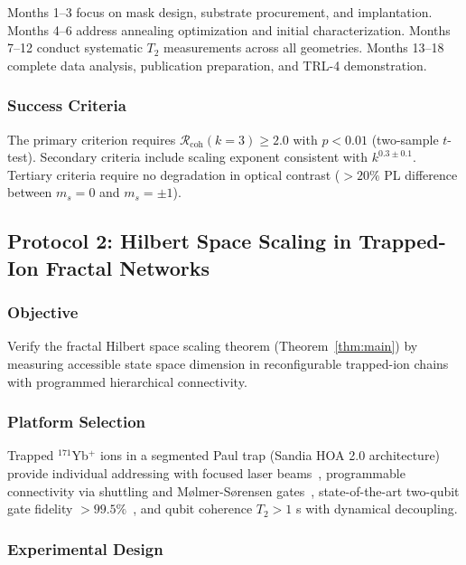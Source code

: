 Months 1--3 focus on mask design, substrate procurement, and implantation. Months 4--6 address annealing optimization and initial characterization. Months 7--12 conduct systematic $T_2$ measurements across all geometries. Months 13--18 complete data analysis, publication preparation, and TRL-4 demonstration.

\subsubsection{Success Criteria}

The primary criterion requires $\mathcal{R}_{\mathrm{coh}}(k=3) \geq 2.0$ with $p < 0.01$ (two-sample $t$-test). Secondary criteria include scaling exponent consistent with $k^{0.3 \pm 0.1}$. Tertiary criteria require no degradation in optical contrast ($> 20\%$ PL difference between $m_s = 0$ and $m_s = \pm 1$).


\subsection{Protocol 2: Hilbert Space Scaling in Trapped-Ion Fractal Networks}

\subsubsection{Objective}

Verify the fractal Hilbert space scaling theorem (Theorem~\ref{thm:main}) by measuring accessible state space dimension in reconfigurable trapped-ion chains with programmed hierarchical connectivity.

\subsubsection{Platform Selection}

Trapped $^{171}$Yb$^+$ ions in a segmented Paul trap (Sandia HOA 2.0 architecture) provide individual addressing with focused laser beams~\cite{Monroe2021}, programmable connectivity via shuttling and M{\o}lmer-S{\o}rensen gates~\cite{Sorensen1999}, state-of-the-art two-qubit gate fidelity $> 99.5\%$~\cite{IonQ2023}, and qubit coherence $T_2 > 1$ s with dynamical decoupling.

\subsubsection{Experimental Design}

